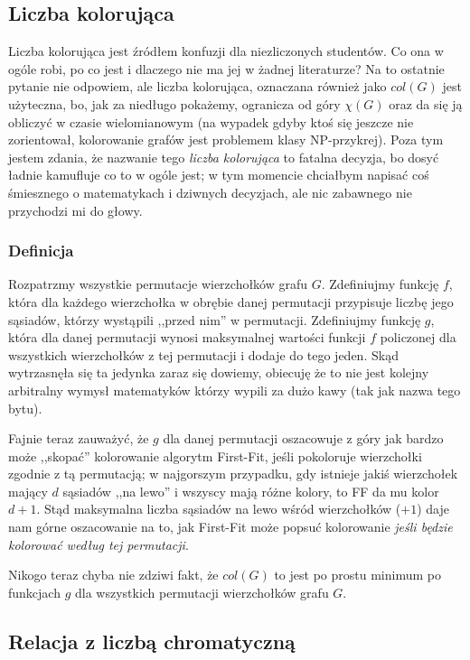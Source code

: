     \subsection{Liczba kolorująca}
    \label{colouring_number}
    Liczba kolorująca jest źródłem konfuzji dla niezliczonych studentów. Co ona w ogóle robi, po co jest i dlaczego nie ma jej w żadnej literaturze? Na to ostatnie pytanie nie odpowiem, ale liczba kolorująca, oznaczana również jako $col(G)$ jest użyteczna, bo, jak za niedługo pokażemy, ogranicza od góry $\chi(G)$ oraz da się ją obliczyć w czasie wielomianowym (na wypadek gdyby ktoś się jeszcze nie zorientował, kolorowanie grafów jest problemem klasy NP-przykrej). Poza tym jestem zdania, że nazwanie tego \textit{liczba kolorująca} to fatalna decyzja, bo dosyć ładnie kamufluje co to w ogóle jest; w tym momencie chciałbym napisać coś śmiesznego o matematykach i dziwnych decyzjach, ale nic zabawnego nie przychodzi mi do głowy. 
    \subsubsection{Definicja}
    Rozpatrzmy wszystkie permutacje wierzchołków grafu $G$. Zdefiniujmy funkcję $f$, która dla każdego wierzchołka w obrębie danej permutacji przypisuje liczbę jego sąsiadów, którzy wystąpili ,,przed nim'' w permutacji. Zdefiniujmy funkcję $g$, która dla danej permutacji wynosi maksymalnej wartości funkcji $f$ policzonej dla wszystkich wierzchołków z tej permutacji i dodaje do tego jeden. Skąd wytrzasnęła się ta jedynka zaraz się dowiemy, obiecuję że to nie jest kolejny arbitralny wymysł matematyków którzy wypili za dużo kawy (tak jak nazwa tego bytu).  

    Fajnie teraz zauważyć, że $g$ dla danej permutacji oszacowuje z góry jak bardzo może ,,skopać'' kolorowanie algorytm First-Fit, jeśli pokoloruje wierzchołki zgodnie z tą permutacją; w najgorszym przypadku, gdy istnieje jakiś wierzchołek mający $d$ sąsiadów ,,na lewo'' i wszyscy mają różne kolory, to FF da mu kolor $d+1$. Stąd maksymalna liczba sąsiadów na lewo wśród wierzchołków ($+1$) daje nam górne oszacowanie na to, jak First-Fit może popsuć kolorowanie \textit{jeśli będzie kolorować według tej permutacji}.  

    Nikogo teraz chyba nie zdziwi fakt, że $col(G)$ to jest po prostu minimum po funkcjach $g$ dla wszystkich permutacji wierzchołków grafu $G$. 
    \subsection{Relacja z liczbą chromatyczną}
